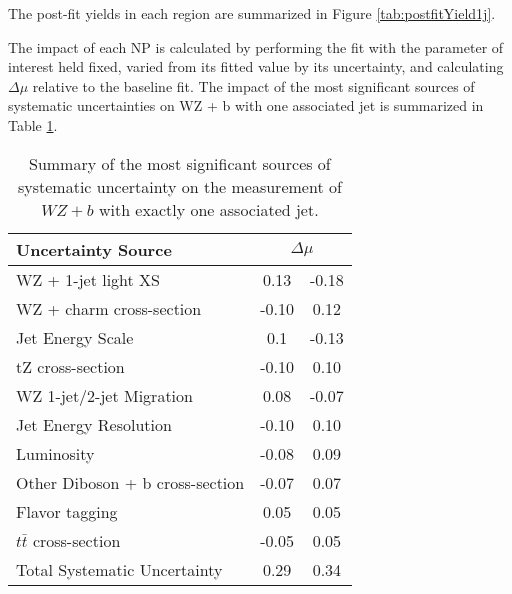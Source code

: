 The post-fit yields in each region are summarized in Figure \ref{tab:postfitYield1j}.

\hspace{-1in}\begin{table}[H]
\begin{adjustwidth}{-3em}{-3em}
\small

\label{tab:postfitYield1j}
\caption{Post-fit yields in each of the 1-jet regions.}                                                                 
\end{adjustwidth} 
\end{table}

The impact of each NP is calculated by performing the fit with the parameter of interest held fixed, varied from its fitted value by its uncertainty, and calculating $\Delta\mu$ relative to the baseline fit.  The impact of the most significant sources of systematic uncertainties on WZ + b with one associated jet is summarized in Table \ref{tab:systematics_1j}. 

\begin{table}[H]
    \centering
    \begin{tabular}{l|cc}
        \hline\hline
        Uncertainty Source & \multicolumn{2}{c}{$\Delta \mu$ }  \\
        \hline
        WZ + 1-jet light XS & 0.13 & -0.18 \\
        WZ + charm cross-section & -0.10 & 0.12 \\
        Jet Energy Scale & 0.1 & -0.13 \\
        tZ cross-section & -0.10 & 0.10 \\
        WZ 1-jet/2-jet Migration & 0.08 & -0.07 \\
        Jet Energy Resolution & -0.10 & 0.10 \\
        Luminosity & -0.08 & 0.09 \\
        Other Diboson + b cross-section & -0.07 & 0.07 \\
        Flavor tagging & 0.05 & 0.05 \\
        $t\bar{t}$ cross-section & -0.05 & 0.05 \\
        \hline
        Total Systematic Uncertainty & 0.29 & 0.34 \\
        \hline\hline
    \end{tabular}
    \caption{Summary of the most significant sources of systematic uncertainty on the measurement of $WZ+b$ with exactly one associated jet.}
    \label{tab:systematics_1j}
\end{table}

